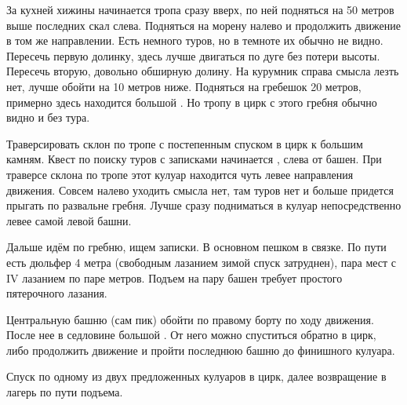 За кухней хижины \geoLighthouse{} начинается тропа сразу вверх, по ней
подняться на 50 метров выше последних скал слева. Подняться на морену
налево и продолжить движение в том же направлении. Есть немного туров,
но в темноте их обычно не видно. Пересечь первую долинку, здесь лучше
двигаться по дуге без потери высоты. Пересечь вторую, довольно
обширную долину. На курумник справа смысла лезть нет, лучше обойти на
10 метров ниже. Подняться на гребешок 20 метров, примерно здесь
находится большой \geoStartOfKoshevoy[тур]. Но тропу в цирк
\geoPeakKoshevoy{} с этого гребня обычно видно и без тура.

Траверсировать склон по тропе с постепенным спуском в цирк к большим
камням. Квест по поиску туров с записками начинается
, слева от башен.
При траверсе склона по тропе этот кулуар находится чуть левее
направления движения. Совсем налево уходить смысла нет, там туров нет
и больше придется прыгать по развальне гребня. Лучше сразу подниматься
в кулуар непосредственно левее самой левой башни.

Дальше идём по гребню, ищем записки. В основном пешком в связке. По
пути есть дюльфер 4 метра (свободным лазанием зимой спуск затруднен),
пара мест с IV лазанием по паре метров. Подъем на пару башен требует
простого пятерочного лазания.

Центральную башню (сам пик) обойти по правому борту по ходу движения.
После нее в седловине большой
. От него можно
спуститься обратно в цирк, либо продолжить движение и пройти последнюю
башню до финишного кулуара.

Спуск по одному из двух предложенных кулуаров в цирк, далее
возвращение в лагерь по пути подъема.
